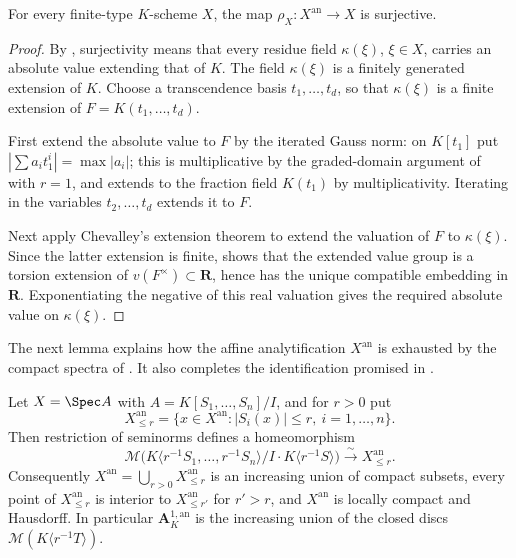 \begin{proposition}
\label{prop:berk-support-surjective}
For every finite-type $K$-scheme $X$, the map
$\rho_X:X^{\mathrm{an}}\to X$ is surjective.
\end{proposition}

\begin{proof}
By , surjectivity means that every
residue field $\kappa(\xi)$, $\xi\in X$, carries an absolute value
extending that of $K$.  The field $\kappa(\xi)$ is a finitely
generated extension of $K$.  Choose a transcendence basis
$t_1,\ldots,t_d$, so that $\kappa(\xi)$ is a finite extension of
$F=K(t_1,\ldots,t_d)$.

First extend the absolute value to $F$ by the iterated Gauss norm: on
$K[t_1]$ put $|\sum a_it_1^i|=\max|a_i|$; this is multiplicative by
the graded-domain argument of  with $r=1$, and
extends to the fraction field $K(t_1)$ by multiplicativity.  Iterating
in the variables $t_2,\ldots,t_d$ extends it to $F$.

Next apply Chevalley's extension theorem
 to extend the valuation of $F$ to
$\kappa(\xi)$.  Since the latter extension is finite,
 shows that the extended value
group is a torsion extension of $v(F^\times)\subset\mathbf R$, hence
has the unique compatible embedding in $\mathbf R$.  Exponentiating
the negative of this real valuation gives the required absolute value on
$\kappa(\xi)$.
\end{proof}

The next lemma explains how the affine analytification $X^{\mathrm{an}}$ is
exhausted by the compact spectra of .  It also
completes the identification promised in .

\begin{lemma}\label{lem:berk-polydisc-exhaustion}
Let $X=\Spec A$ with $A=K[S_1,\ldots,S_n]/I$, and for $r>0$ put
\[
 X^{\mathrm{an}}_{\leq r}
 =\{x\in X^{\mathrm{an}}:|S_i(x)|\leq r,\ i=1,\ldots,n\}.
\]
Then restriction of seminorms defines a homeomorphism
\[
 \mathcal M\bigl(K\langle r^{-1}S_1,\ldots,r^{-1}S_n\rangle/
 I\cdot K\langle r^{-1}S\rangle\bigr)
 \xrightarrow{\ \sim\ }
 X^{\mathrm{an}}_{\leq r}.
\]
Consequently $X^{\mathrm{an}}=\bigcup_{r>0}X^{\mathrm{an}}_{\leq r}$ is
an increasing union of compact subsets, every point of
$X^{\mathrm{an}}_{\leq r}$ is interior to $X^{\mathrm{an}}_{\leq r'}$
for $r'>r$, and $X^{\mathrm{an}}$ is locally compact and Hausdorff.
In particular $\mathbf A^{1,\mathrm{an}}_K$ is the increasing union of
the closed discs $\mathcal M(K\langle r^{-1}T\rangle)$.
\end{lemma}

